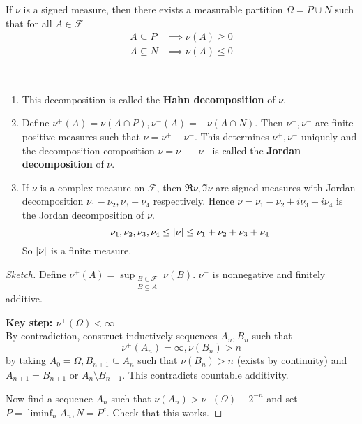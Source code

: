 \documentclass{article}
\begin{document}
\begin{nthm}\label{thm:hahn-decomp}
  If $\nu$ is a signed measure, then there exists a measurable partition $\Omega = P \cup N$ such that for all $A \in \mathcal F$
  \begin{align*}
    A \subseteq P & \implies \nu(A) \ge 0 \\
    A \subseteq N & \implies \nu(A) \le 0
  \end{align*}
\end{nthm}
\begin{rmks}~
  
  \begin{enumerate}
    \item This decomposition is called the {\bf Hahn decomposition} of $\nu$.
    \item Define $\nu^+(A) = \nu(A \cap P), \nu^-(A) = -\nu(A \cap N)$. Then $\nu^+, \nu^-$ are finite positive measures such that $\nu = \nu^+ - \nu^-$. This determines $\nu^+, \nu^-$ uniquely and the decomposition composition $\nu = \nu^+ - \nu^-$ is called the {\bf Jordan decomposition} of $\nu$.
    \item If $\nu$ is a complex measure on $\mathcal F$, then $\Re\nu, \Im\nu$ are signed measures with Jordan decomposition $\nu_1 - \nu_2, \nu_3 - \nu_4$ respectively. Hence $\nu = \nu_1 - \nu_2 + i\nu_3 - i\nu_4$ is the Jordan decomposition of $\nu$.
    $$\nu_1, \nu_2, \nu_3, \nu_4 \le \left\lvert \nu\right\rvert \le \nu_1 + \nu_2 + \nu_3 + \nu_4$$
    So $\left\lvert \nu\right\rvert$ is a finite measure.
  \end{enumerate}
\end{rmks}
\begin{proof}[Sketch]
  Define $\nu^+(A) = \sup_{\substack{B \in \mathcal F \\ B \subseteq A}} \nu(B)$. $\nu^+$ is nonnegative and finitely additive.

  {\bf Key step: $\nu^+(\Omega) < \infty$} \\
  By contradiction, construct inductively sequences $A_n, B_n$ such that
  $$\nu^+(A_n) = \infty, \nu(B_n) > n$$
  by taking $A_0 = \Omega, B_{n + 1} \subseteq A_n$ such that $\nu(B_n) > n$ (exists by continuity) and $A_{n + 1} = B_{n + 1}$ or $A_n \setminus B_{n + 1}$. This contradicts countable additivity.

  Now find a sequence $A_n$ such that $\nu(A_n) > \nu^+(\Omega) - 2^{-n}$ and set $P = \liminf_n A_n, N = P^c$. Check that this works.
\end{proof}

\newlec
\end{document}
